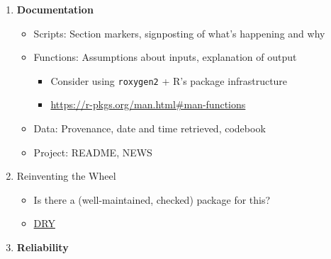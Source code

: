 \documentclass[
]{article}
\providecommand{\tightlist}{%
  \setlength{\itemsep}{0pt}\setlength{\parskip}{0pt}}
\begin{document}
\begin{enumerate}
  \begin{itemize}
  \tightlist
  \item
    Performance for users

    \begin{itemize}
    \tightlist
    \item
      \texttt{tictoc} for simple wall time checks
    \item
      Profiling for more thorough optimization
    \end{itemize}
  \item
    Resource use

    \begin{itemize}
    \tightlist
    \item
      Does this really need to be run on the MERCED cluster?
    \item
      How much will this cost the lab/team if it's accidentally run 1,000 times?
    \item
      Cache raw returns from web scraping and API queries
    \end{itemize}
  \end{itemize}
\item
  \textbf{Documentation}

  \begin{itemize}
  \tightlist
  \item
    Scripts: Section markers, signposting of what's happening and why
  \item
    Functions: Assumptions about inputs, explanation of output

    \begin{itemize}
    \tightlist
    \item
      Consider using \texttt{roxygen2} + R's package infrastructure
    \item
      \url{https://r-pkgs.org/man.html\#man-functions}
    \end{itemize}
  \item
    Data: Provenance, date and time retrieved, codebook
  \item
    Project: README, NEWS
  \end{itemize}
\item
  Reinventing the Wheel

  \begin{itemize}
  \tightlist
  \item
    Is there a (well-maintained, checked) package for this?
  \item
    \href{https://en.wikipedia.org/wiki/Don\%27t_repeat_yourself}{DRY}
  \end{itemize}
\item
  \textbf{Reliability}


\end{enumerate}
\end{document}
